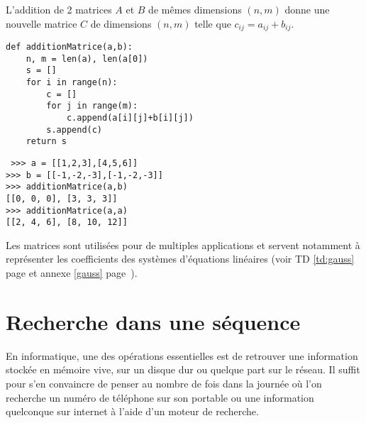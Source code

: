 \begin{ex}\label{ex:matrices}
L'addition de 2 matrices $A$ et $B$ de mêmes dimensions $(n,m)$ donne
une nouvelle matrice $C$ de dimensions $(n,m)$ telle que $c_{ij} = a_{ij} + b_{ij}$.

\noindent\mbox{}\hspace*{1cm}\begin{py}{9cm}
\begin{verbatim}
def additionMatrice(a,b):
    n, m = len(a), len(a[0])
    s = []
    for i in range(n):
        c = []
        for j in range(m):
            c.append(a[i][j]+b[i][j])
        s.append(c)
    return s
\end{verbatim}
\end{py}
\hfill
\begin{py}{6cm}\tt
>>> a = [[1,2,3],[4,5,6]]\\
>>> b = [[-1,-2,-3],[-1,-2,-3]]\\
>>> additionMatrice(a,b)\\
\mbox{}[[0, 0, 0], [3, 3, 3]]\\
>>> additionMatrice(a,a)\\
\mbox{}[[2, 4, 6], [8, 10, 12]]
\end{py}
\end{ex}

Les matrices sont utilisées pour de multiples applications et servent notamment 
à représenter les coefficients des systèmes d'équations linéaires 
(voir TD \ref{td:gauss} page \pageref{td:gauss} et annexe \ref{gauss} page~\pageref{gauss}).

\section{Recherche dans une séquence}\label{recherche}
En informatique, une des opérations essentielles est de retrouver une information
stockée en mémoire vive, sur un disque dur ou quelque part sur le réseau. Il suffit
pour s'en convaincre de penser au nombre de fois dans la journée  où l'on recherche
un numéro de téléphone sur son portable ou une information quelconque sur internet
à l'aide d'un moteur de recherche.

